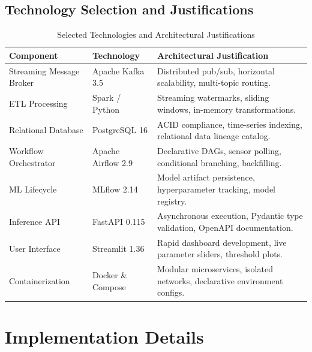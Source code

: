\documentclass[12pt,a4paper]{article}
\begin{document}
\subsection{Technology Selection and Justifications}
\begin{table}[H]
\centering
\caption{Selected Technologies and Architectural Justifications}
\begin{tabular}{@{}lll@{}}
\toprule
\textbf{Component} & \textbf{Technology} & \textbf{Architectural Justification} \\ \midrule
Streaming Message Broker & Apache Kafka 3.5 & Distributed pub/sub, horizontal scalability, multi-topic routing. \\
ETL Processing & Spark / Python & Streaming watermarks, sliding windows, in-memory transformations. \\
Relational Database & PostgreSQL 16 & ACID compliance, time-series indexing, relational data lineage catalog. \\
Workflow Orchestrator & Apache Airflow 2.9 & Declarative DAGs, sensor polling, conditional branching, backfilling. \\
ML Lifecycle & MLflow 2.14 & Model artifact persistence, hyperparameter tracking, model registry. \\
Inference API & FastAPI 0.115 & Asynchronous execution, Pydantic type validation, OpenAPI documentation. \\
User Interface & Streamlit 1.36 & Rapid dashboard development, live parameter sliders, threshold plots. \\
Containerization & Docker \& Compose & Modular microservices, isolated networks, declarative environment configs. \\ \bottomrule
\end{tabular}
\end{table}

\section{Implementation Details}
\end{document}
